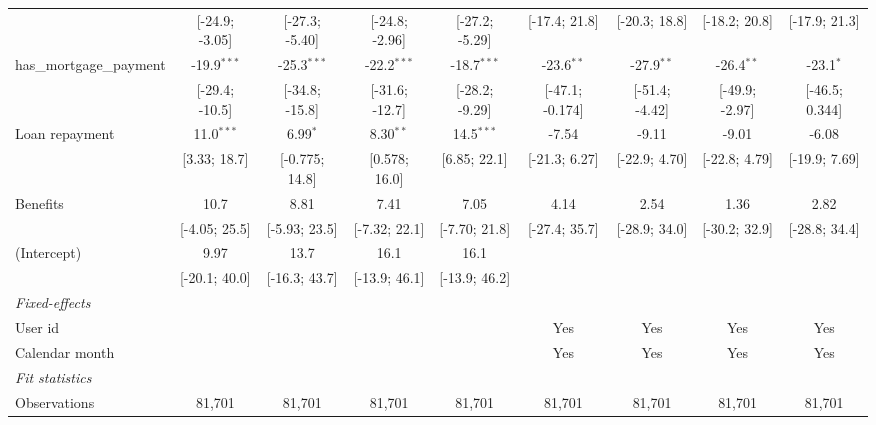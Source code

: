\begin{table}[htbp]
\begin{threeparttable}[b]
\begin{tabular}{lcccccccc}
                                  & [-24.9; -3.05]  & [-27.3; -5.40]  & [-24.8; -2.96]  & [-27.2; -5.29]  & [-17.4; 21.8]   & [-20.3; 18.8]   & [-18.2; 20.8]   & [-17.9; 21.3]\\   
         has\_mortgage\_payment   & -19.9$^{***}$   & -25.3$^{***}$   & -22.2$^{***}$   & -18.7$^{***}$   & -23.6$^{**}$    & -27.9$^{**}$    & -26.4$^{**}$    & -23.1$^{*}$\\   
                                  & [-29.4; -10.5]  & [-34.8; -15.8]  & [-31.6; -12.7]  & [-28.2; -9.29]  & [-47.1; -0.174] & [-51.4; -4.42]  & [-49.9; -2.97]  & [-46.5; 0.344]\\   
         Loan repayment           & 11.0$^{***}$    & 6.99$^{*}$      & 8.30$^{**}$     & 14.5$^{***}$    & -7.54           & -9.11           & -9.01           & -6.08\\   
                                  & [3.33; 18.7]    & [-0.775; 14.8]  & [0.578; 16.0]   & [6.85; 22.1]    & [-21.3; 6.27]   & [-22.9; 4.70]   & [-22.8; 4.79]   & [-19.9; 7.69]\\   
         Benefits                 & 10.7            & 8.81            & 7.41            & 7.05            & 4.14            & 2.54            & 1.36            & 2.82\\   
                                  & [-4.05; 25.5]   & [-5.93; 23.5]   & [-7.32; 22.1]   & [-7.70; 21.8]   & [-27.4; 35.7]   & [-28.9; 34.0]   & [-30.2; 32.9]   & [-28.8; 34.4]\\   
         (Intercept)              & 9.97            & 13.7            & 16.1            & 16.1            &                 &                 &                 &   \\   
                                  & [-20.1; 40.0]   & [-16.3; 43.7]   & [-13.9; 46.1]   & [-13.9; 46.2]   &                 &                 &                 &   \\   
         \midrule
         \emph{Fixed-effects}\\
         User id                  &                 &                 &                 &                 & Yes             & Yes             & Yes             & Yes\\  
         Calendar month           &                 &                 &                 &                 & Yes             & Yes             & Yes             & Yes\\  
         \midrule
         \emph{Fit statistics}\\
         Observations             & 81,701          & 81,701          & 81,701          & 81,701          & 81,701          & 81,701          & 81,701          & 81,701\\  

\end{tabular}
\end{threeparttable}
\end{table}
